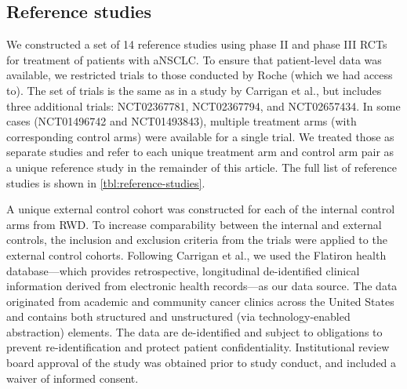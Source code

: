\documentclass[11pt,final,fleqn]{article}\usepackage[]{graphicx}\usepackage[]{color}
\begin{document}
\subsection{Reference studies}
We constructed a set of 14 reference studies using phase II and phase III RCTs for treatment of patients with  aNSCLC. To ensure that patient-level data was available, we restricted trials to those conducted by Roche (which we had access to). The set of trials is the same as in a study by Carrigan et al.\cite{carrigan2020using}, but includes three additional trials: NCT02367781, NCT02367794, and NCT02657434. In some cases (NCT01496742 and NCT01493843), multiple treatment arms (with corresponding control arms) were available for a single trial. We treated those as separate studies and  refer to each unique treatment arm and control arm pair as a unique reference study in the remainder of this article. The full list of reference studies is shown in \autoref{tbl:reference-studies}.

A unique external control cohort was constructed for each of the internal control arms from RWD. To increase comparability between the internal and external controls, the inclusion and exclusion criteria from the trials were applied to the external control cohorts. Following Carrigan et al., we used the Flatiron health database---which provides retrospective, longitudinal de-identified clinical information derived from electronic health records---as our data source. The data originated from academic and community cancer clinics across the United States and contains both structured and unstructured (via technology-enabled abstraction) elements.\cite{birnbaum2020model, ma2020comparison} The data are de-identified and subject to obligations to prevent re-identification and protect patient confidentiality. Institutional review board approval of the study was obtained prior to study conduct, and included a waiver of informed consent.
\end{document}
